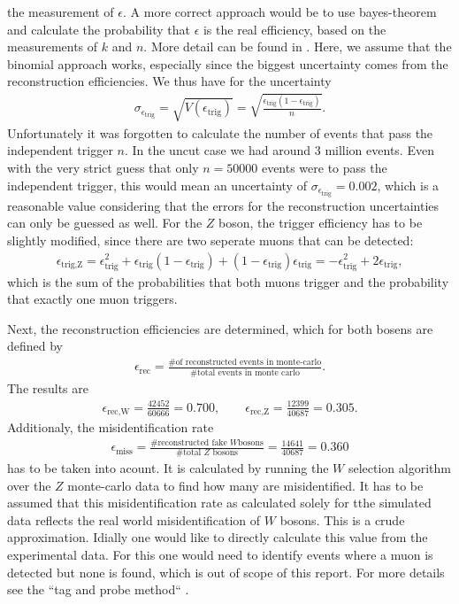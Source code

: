 \documentclass[twoside,        %
               BCOR12mm,       %
               ngerman,english, %
               fleqn,headsepline=false,footsepline=false
              ]{Vorlage/MFPREPORT}
\begin{document}
the measurement of $\epsilon$. A more correct approach would be to use
bayes-theorem and calculate the probability that $\epsilon$ is the real
efficiency, based on the measurements of $k$ and $n$. More detail can be found
in \cite{efferror}. Here, we assume that the binomial approach works,
especially since the biggest uncertainty comes from the reconstruction
efficiencies. We thus have for the uncertainty
\begin{align}
    \label{eq:uncerteff}
    \sigma_{\epsilon_\text{trig}}=\sqrt{V(\epsilon_\text{trig})}=\sqrt{\frac{\epsilon_\text{trig}(1-\epsilon_\text{trig})}{n}}.
\end{align}
Unfortunately it was forgotten to calculate the number of events that pass the
independent trigger $n$. In the uncut case we had around 3 million events. Even
with the very strict guess that only $n=50000$ events were to pass the
independent trigger, this would mean an uncertainty of
$\sigma_{\epsilon_\text{trig}}=0.002$, which is a reasonable value considering
that the errors for the reconstruction uncertainties can only be guessed as
well. For the $Z$ boson, the trigger efficiency has to be slightly modified,
since there are two seperate muons that can be detected:
\begin{align}
    \label{eq:trigeffZ}
    \epsilon_\text{trig,Z}=\epsilon_\text{trig}^2+\epsilon_\text{trig}(1-\epsilon_\text{trig})+(1-\epsilon_\text{trig})\epsilon_\text{trig}=-\epsilon_\text{trig}^2+2\epsilon_\text{trig},
\end{align}
which is the sum of the probabilities that both muons trigger and the
probability that exactly one muon triggers.

Next, the reconstruction efficiencies are determined, which for both bosens are
defined by
\begin{align}
    \label{eq:receff}
    \epsilon_\text{rec}=\frac{\text{\# of reconstructed events in
    monte-carlo}}{\text{\# total events in monte carlo}}.
\end{align}
The results are
\begin{align}
    \label{eq:receffres}
    \epsilon_\text{rec,W}=\frac{42452}{60666}=0.700,\qquad
    \epsilon_\text{rec,Z}=\frac{12399}{40687}=0.305.
\end{align}
Additionaly, the misidentification rate
\begin{align}
    \label{eq:miss}
\epsilon_\text{miss}=\frac{\text{\# reconstructed fake $W$
bosons}}{\text{\# total $Z$ bosons}}=\frac{14641}{40687}=0.360
\end{align}
 has to be taken into
acount. It is calculated by running the $W$ selection algorithm over the $Z$
monte-carlo data to find how many are misidentified.
It has to be assumed that this misidentification rate as calculated solely for
tthe simulated data reflects the real world misidentification of $W$ bosons.
This is a crude approximation. Idially one would like to directly calculate
this value from the experimental data. For this one would need to identify
events where a muon is detected but none is found, which is out of scope
of this report. For more details see the ``tag and probe method`` \cite{tagprobe}.
\end{document}
